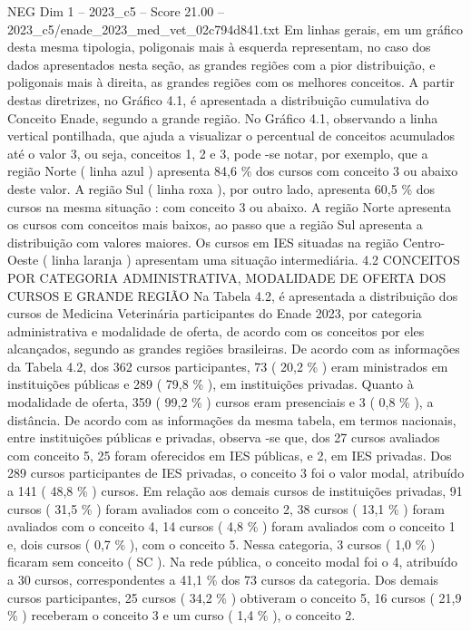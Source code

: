 \begin{textsample}{NEG Dim 1 – 2023\_c5 – Score 21.00 – 2023\_c5/enade\_2023\_med\_vet\_02c794d841.txt}
Em linhas gerais, em um gráfico desta mesma tipologia, poligonais mais à esquerda representam, no caso dos dados apresentados nesta seção, as grandes regiões com a pior distribuição, e poligonais mais à direita, as grandes regiões com os melhores conceitos.
A partir destas diretrizes, no Gráfico 4.1, é apresentada a distribuição cumulativa do Conceito Enade, segundo a grande região.
No Gráfico 4.1, observando a linha vertical pontilhada, que ajuda a visualizar o percentual de conceitos acumulados até o valor 3, ou seja, conceitos 1, 2 e 3, pode -se notar, por exemplo, que a região Norte ( linha azul ) apresenta 84,6 \% dos cursos com conceito 3 ou abaixo deste valor.
A região Sul ( linha roxa ), por outro lado, apresenta 60,5 \% dos cursos na mesma situação : com conceito 3 ou abaixo.
A região Norte apresenta os cursos com conceitos mais baixos, ao passo que a região Sul apresenta a distribuição com valores maiores.
Os cursos em IES situadas na região Centro-Oeste ( linha laranja ) apresentam uma situação intermediária. 4.2 CONCEITOS POR CATEGORIA ADMINISTRATIVA, MODALIDADE DE OFERTA DOS CURSOS E GRANDE REGIÃO Na Tabela 4.2, é apresentada a distribuição dos cursos de Medicina Veterinária participantes do Enade 2023, por categoria administrativa e modalidade de oferta, de acordo com os conceitos por eles alcançados, segundo as grandes regiões brasileiras.
De acordo com as informações da Tabela 4.2, dos 362 cursos participantes, 73 ( 20,2 \% ) eram ministrados em instituições públicas e 289 ( 79,8 \% ), em instituições privadas.
Quanto à modalidade de oferta, 359 ( 99,2 \% ) cursos eram presenciais e 3 ( 0,8 \% ), a distância.
De acordo com as informações da mesma tabela, em termos nacionais, entre instituições públicas e privadas, observa -se que, dos 27 cursos avaliados com conceito 5, 25 foram oferecidos em IES públicas, e 2, em IES privadas.
Dos 289 cursos participantes de IES privadas, o conceito 3 foi o valor modal, atribuído a 141 ( 48,8 \% ) cursos.
Em relação aos demais cursos de instituições privadas, 91 cursos ( 31,5 \% ) foram avaliados com o conceito 2, 38 cursos ( 13,1 \% ) foram avaliados com o conceito 4, 14 cursos ( 4,8 \% ) foram avaliados com o conceito 1 e, dois cursos ( 0,7 \% ), com o conceito 5.
Nessa categoria, 3 cursos ( 1,0 \% ) ficaram sem conceito ( SC ).
Na rede pública, o conceito modal foi o 4, atribuído a 30 cursos, correspondentes a 41,1 \% dos 73 cursos da categoria.
Dos demais cursos participantes, 25 cursos ( 34,2 \% ) obtiveram o conceito 5, 16 cursos ( 21,9 \% ) receberam o conceito 3 e um curso ( 1,4 \% ), o conceito 2.

\end{textsample}
